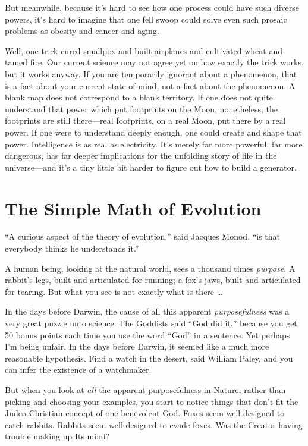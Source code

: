 {
 But meanwhile, because it's hard to see how one
process could have such diverse powers, it's hard to
imagine that one fell swoop could solve even such prosaic problems as
obesity and cancer and aging.}

{
 Well, one trick cured smallpox and built airplanes and cultivated
wheat and tamed fire. Our current science may not agree yet on how
exactly the trick works, but it works anyway. If you are temporarily
ignorant about a phenomenon, that is a fact about your current state of
mind, not a fact about the phenomenon. A blank map does not correspond
to a blank territory. If one does not quite understand that power which
put footprints on the Moon, nonetheless, the footprints are still
there---real footprints, on a real Moon, put there by a real power. If
one were to understand deeply enough, one could create and shape that
power. Intelligence is as real as electricity. It's
merely far more powerful, far more dangerous, has far deeper
implications for the unfolding story of life in the universe---and
it's a tiny little bit harder to figure out how to
build a generator.}

\myendsectiontext

\chapter{The Simple Math of Evolution}


{
 ``A curious aspect of the theory of
evolution,'' said Jacques Monod,
``is that everybody thinks he understands
it.'' }

{
 A human being, looking at the natural world, sees a thousand times
\textit{purpose.} A rabbit's legs, built and
articulated for running; a fox's jaws, built and
articulated for tearing. But what you see is not exactly what is there
\ldots}

{
 In the days before Darwin, the cause of all this apparent
\textit{purposefulness} was a very great puzzle unto science. The
Goddists said ``God did it,''
because you get 50 bonus points each time you use the word
``God'' in a sentence. Yet perhaps
I'm being unfair. In the days before Darwin, it seemed
like a much more reasonable hypothesis. Find a watch in the desert,
said William Paley, and you can infer the existence of a watchmaker.}

{
 But when you look at \textit{all} the apparent purposefulness in
Nature, rather than picking and choosing your examples, you start to
notice things that don't fit the Judeo-Christian
concept of one benevolent God. Foxes seem well-designed to catch
rabbits. Rabbits seem well-designed to evade foxes. Was the Creator
having trouble making up Its mind?}

